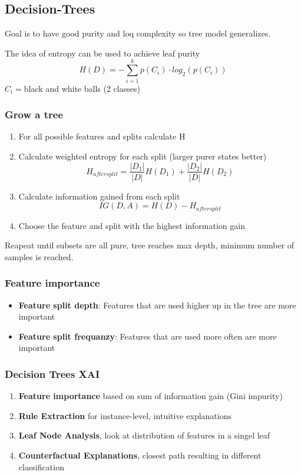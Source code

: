 \subsection{Decision-Trees}
Goal is to have good purity and loq complexity so tree model generalizes.

The idea of entropy can be used to achieve leaf purity
\[
H(D) = -\sum_{i = 1}^{k}p(C_i) \cdot log_2(p(C_i))
\]
\(C_i = \)black and white balls (2 classes)
\subsubsection{Grow a tree}
\begin{enumerate}
    \item For all possible features and splits calculate H
    \item Calculate weighted entropy for each split (larger purer states better)
    \[
    H_{after split} = \frac{|D_1|}{|D|}H(D_1) + \frac{|D_2|}{|D|}H(D_2)
    \]
    \item Calculate information gained from each split
    \[
    IG(D,A) = H(D) - H_{after split}
    \]
    \item Choose the feature and split with the highest information gain
\end{enumerate}
Reapeat until subsets are all pure, tree reaches max depth, minimum number of samples is reached.
\subsubsection{Feature importance}
\begin{itemize}
    \item \textbf{Feature split depth}: Features that are used higher up in the tree are more important
    \item \textbf{Feature split frequanzy}:
    Features that are used more often are more important
\end{itemize}
\subsubsection{Decision Trees XAI}
\begin{enumerate}
    \item \textbf{Feature importance} based on sum of information gain (Gini impurity)
    \item \textbf{Rule Extraction} for instance-level, intuitive explanations
    \item \textbf{Leaf Node Analysis}, look at distribution of features in a singel leaf
    \item \textbf{Counterfactual Explanations}, closest path resulting in different classification
\end{enumerate}
